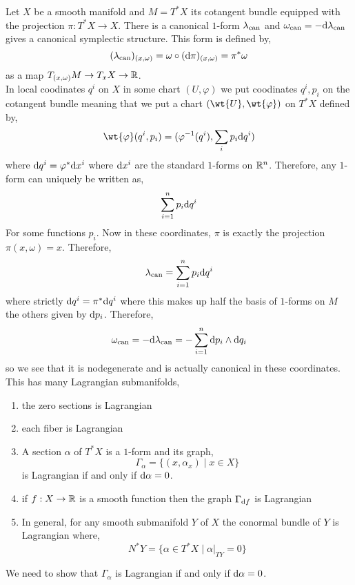 \documentclass[12pt]{article}
\begin{document}
Let $X$ be a smooth manifold and $M = T^* X$ its cotangent bundle equipped with the projection $\pi : T^* X \to X$. There is a canonical $1$-form $\lambda_{\text{can}}$ and $\omega_{\text{can}} = -\mathrm{d}{\lambda_{\text{can}}}$ gives a canonical symplectic structure. This form is defined by,
\[ (\lambda_{\text{can}})_{(x, \omega)} = \omega \circ (\mathrm{d}{\pi})_{(x, \omega)} = \pi^* \omega \]
as a map $T_{(x, \omega)} M \to T_x X \to \mathbb{R}$. 
\bigskip\\
In local coodinates $q^i$ on $X$ in some chart $(U, \varphi)$ we put coodinates $q^i, p_i$ on the cotangent bundle meaning that we put a chart $(\wt{U}, \wt{\varphi})$ on $T^* X$ defined by,
\[ \wt{\varphi}(q^i, p_i) = (\varphi^{-1}(q^i), \sum_i p_i \d{q^i}) \]
where $\mathrm{d}{q^i} = \varphi^* \mathrm{d}{x^i}$ where $\mathrm{d}{x^i}$ are the standard $1$-forms on $\mathbb{R}^n$. Therefore, any $1$-form can uniquely be written as,
\[ \sum_{i = 1}^n p_i \mathrm{d}{q^i} \]
For some functions $p_i$. Now in these coordinates, $\pi$ is exactly the projection $\pi(x, \omega) = x$. Therefore,
\[ \lambda_{\text{can}} = \sum_{i = 1}^n p_i  \mathrm{d}{q^i} \]
where strictly $\mathrm{d}{q^i} = \pi^* \mathrm{d}{q^i}$ where this makes up half the basis of $1$-forms on $M$ the others given by $\mathrm{d}{p_i}$. Therefore,
\[ \omega_{\text{can}} = - \mathrm{d}{\lambda_{\text{can}}} = - \sum_{i = 1}^n \mathrm{d}{p_i} \wedge \mathrm{d}{q_i} \]
so we see that it is nodegenerate and is actually canonical in these coordinates. 
\bigskip\\
This has many Lagrangian submanifolds,
\begin{enumerate}
\item the zero sections is Lagrangian
\item each fiber is Lagrangian
\item A section $\alpha$ of $T^* X$ is a $1$-form and its graph,
\[ \Gamma_\alpha = \{ (x, \alpha_x) \mid x \in X \} \]
is Lagrangian if and only if $\mathrm{d}{\alpha} = 0$.
\item if $f : X \to \mathbb{R}$ is a smooth function then the graph $\Gamma_{\mathrm{d}{f}}$ is Lagrangian
\item In general, for any smooth submanifold $Y$ of $X$ the conormal bundle of $Y$ is Lagrangian where,
\[ N^* Y = \{ \alpha \in T^* X \mid \alpha|_{T Y} = 0 \} \]
\end{enumerate}

\begin{exercise}
We need to show that $\Gamma_\alpha$ is Lagrangian if and only if $\mathrm{d}{\alpha} = 0$. 
\end{exercise}
\end{document}
